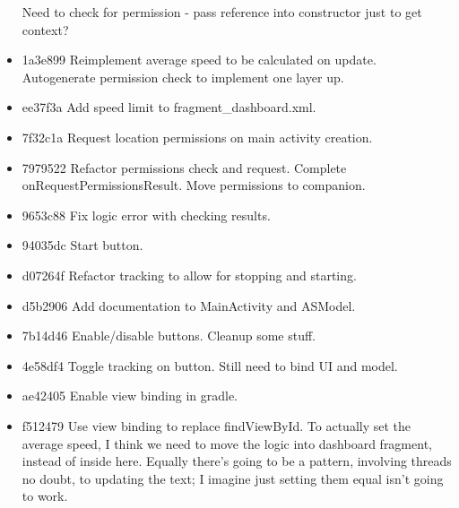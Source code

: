 \documentclass[11pt, a4paper, notitlepage]{report}
\begin{document}
\begin{itemize}
	Need to check for permission - pass reference into constructor just to get context?
	
	\item 1a3e899 Reimplement average speed to be calculated on update. Autogenerate permission check to implement one layer up. 
	\item ee37f3a Add speed limit to fragment\_dashboard.xml. 
	\item 7f32c1a Request location permissions on main activity creation. 
	\item 7979522 Refactor permissions check and request. Complete onRequestPermissionsResult. Move permissions to companion. 
	\item 9653c88 Fix logic error with checking results. 
	\item 94035dc Start button. 
	\item d07264f Refactor tracking to allow for stopping and starting. 
	\item d5b2906 Add documentation to MainActivity and ASModel. 
	\item 7b14d46 Enable/disable buttons. Cleanup some stuff. 
	\item 4e58df4 Toggle tracking on button. Still need to bind UI and model. 
	\item ae42405 Enable view binding in gradle. 
	\item f512479 Use view binding to replace findViewById. To actually set the average speed, I think we need to move the logic into dashboard fragment, instead of inside here.
	Equally there's going to be a pattern, involving threads no doubt, to updating the text; I imagine just setting them equal isn't going to work.
	

\end{itemize}
\end{document}
